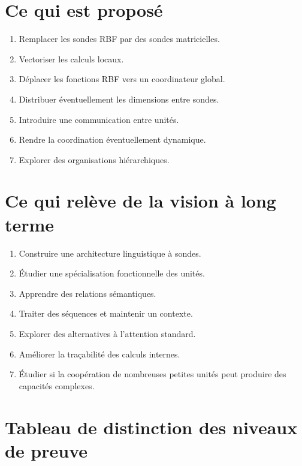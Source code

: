 \documentclass[11pt,a4paper]{report}
\begin{document}
\section{Ce qui est proposé}

\begin{enumerate}
  \item Remplacer les sondes RBF par des sondes matricielles.
  \item Vectoriser les calculs locaux.
  \item Déplacer les fonctions RBF vers un coordinateur global.
  \item Distribuer éventuellement les dimensions entre sondes.
  \item Introduire une communication entre unités.
  \item Rendre la coordination éventuellement dynamique.
  \item Explorer des organisations hiérarchiques.
\end{enumerate}

\section{Ce qui relève de la vision à long terme}

\begin{enumerate}
  \item Construire une architecture linguistique à sondes.
  \item Étudier une spécialisation fonctionnelle des unités.
  \item Apprendre des relations sémantiques.
  \item Traiter des séquences et maintenir un contexte.
  \item Explorer des alternatives à l'attention standard.
  \item Améliorer la traçabilité des calculs internes.
  \item Étudier si la coopération de nombreuses petites unités
  peut produire des capacités complexes.
\end{enumerate}

\section{Tableau de distinction des niveaux de preuve}
\end{document}
